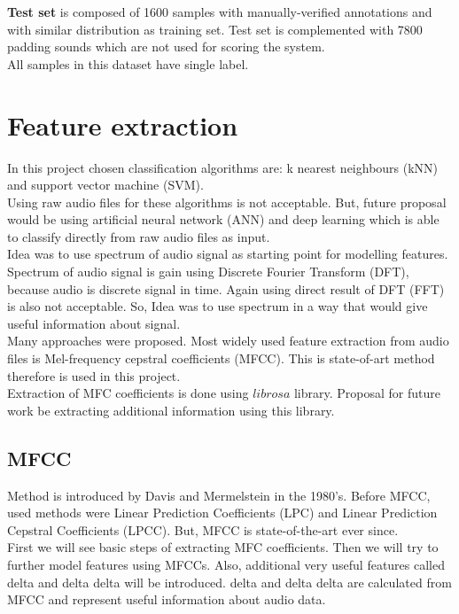 \documentclass{article}
\begin{document}
\textbf{Test set} is composed of 1600 samples with manually-verified annotations and with similar distribution as 
training set. Test set is complemented with 7800 padding sounds which are not used for scoring the system.\\
All samples in this dataset have single label.\\

\section{Feature extraction}
In this project chosen classification algorithms are: k nearest neighbours (kNN) and support vector machine (SVM).\\
Using raw audio files for these algorithms is not acceptable. But, future proposal would be using artificial neural network (ANN)
and deep learning which is able to classify directly from raw audio files as input.\\
Idea was to use spectrum of audio signal as starting point for modelling features. Spectrum of audio signal
is gain using Discrete Fourier Transform (DFT), because audio is discrete signal in time. Again using direct
result of DFT (FFT) is also not acceptable. So, Idea was to use spectrum in a way that would give useful 
information about signal. \\
Many approaches were proposed. Most widely used feature extraction from audio files is Mel-frequency cepstral 
coefficients (MFCC). This is state-of-art method therefore is used in this project.\\
Extraction of MFC coefficients is done using $librosa$ library. Proposal for future work be extracting additional 
information using this library.

\subsection{MFCC}
Method is introduced by Davis and Mermelstein in the 1980's. Before MFCC, used methods were Linear Prediction 
Coefficients (LPC) and Linear Prediction Cepstral Coefficients (LPCC). But, MFCC is state-of-the-art ever since.\\
First we will see basic steps of extracting MFC coefficients. Then we will try to further model features using MFCCs.
Also, additional very useful features called delta and delta delta will be introduced. delta and delta delta are 
calculated from MFCC and represent useful information about audio data.\\
\end{document}
